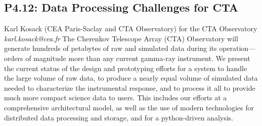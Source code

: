 \documentclass{report}
\begin{document}
\subsection*{P4.12: Data Processing Challenges for CTA}
\bigskip
Karl Kosack (CEA Paris-Saclay and CTA Observatory) \newline   \newline   \newline   \newline  \newline  for the CTA Observatory\newline\newline
{\it karl.kosack@cea.fr}\newline
\newline\newline
The Cherenkov Telescope Array (CTA) Observatory will generate hundreds of petabytes of raw and simulated data during its operation---orders of magnitude more than any current gamma-ray instrument.  We present the current status of the design and prototyping efforts for a system to handle the large volume of raw data, to produce a nearly equal volume of simulated data needed to characterize the instrumental response, and to process it all to provide much more compact science
data to users. This includes our efforts at a comprehensive architectural model, as well as the use of modern technologies for distributed data processing and storage, and for a python-driven analysis.\newline
\newpage
\end{document}
